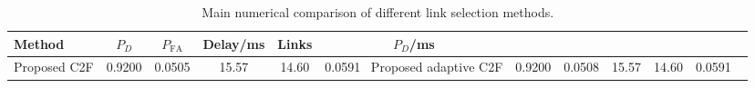 \begin{table}[t]
    \centering
    \caption{Main numerical comparison of different link selection methods.}
    \label{tab:main_summary}
    \begin{tabular}{l c c c c c}
        \hline
        Method & $P_D$ & $P_{\mathrm{FA}}$ & Delay/ms & Links & $P_D$/ms \\
        \hline
        Proposed C2F & 0.9200 & 0.0505 & 15.57 & 14.60 & 0.0591 \
        Proposed adaptive C2F & 0.9200 & 0.0508 & 15.57 & 14.60 & 0.0591 \
        \hline
    \end{tabular}
\end{table}
